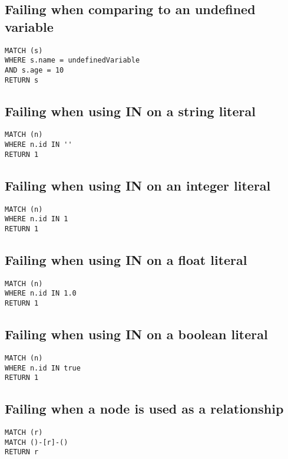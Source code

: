 \subsection{Failing when comparing to an undefined variable}

\begin{lstlisting}
MATCH (s)
WHERE s.name = undefinedVariable
AND s.age = 10
RETURN s
\end{lstlisting}

\subsection{Failing when using IN on a string literal}

\begin{lstlisting}
MATCH (n)
WHERE n.id IN ''
RETURN 1
\end{lstlisting}

\subsection{Failing when using IN on an integer literal}

\begin{lstlisting}
MATCH (n)
WHERE n.id IN 1
RETURN 1
\end{lstlisting}

\subsection{Failing when using IN on a float literal}

\begin{lstlisting}
MATCH (n)
WHERE n.id IN 1.0
RETURN 1
\end{lstlisting}

\subsection{Failing when using IN on a boolean literal}

\begin{lstlisting}
MATCH (n)
WHERE n.id IN true
RETURN 1
\end{lstlisting}

\subsection{Failing when a node is used as a relationship}

\begin{lstlisting}
MATCH (r)
MATCH ()-[r]-()
RETURN r
\end{lstlisting}

